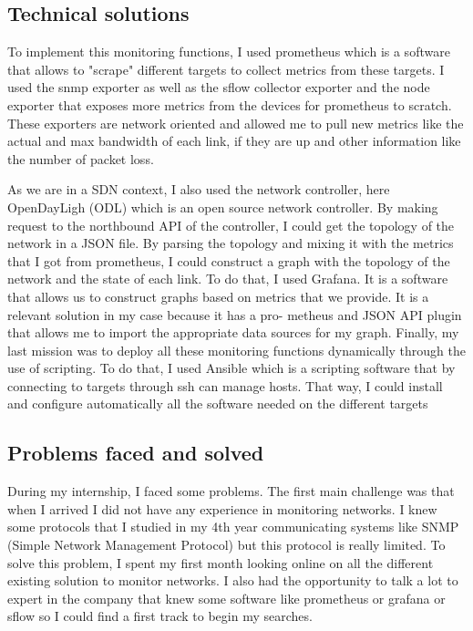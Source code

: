 \subsection{Technical solutions}

To implement this monitoring functions, I used prometheus which is a software that allows to
"scrape" different targets to collect metrics from these targets. I used the snmp exporter as well as
the sflow collector exporter and the node exporter that exposes more metrics from the devices for
prometheus to scratch. These exporters are network oriented and allowed me to pull new metrics
like the actual and max bandwidth of each link, if they are up and other information like the number
of packet loss.
\smallskip

As we are in a SDN context, I also used the network controller, here OpenDayLigh (ODL) which
is an open source network controller. By making request to the northbound API of the controller,
I could get the topology of the network in a JSON file. By parsing the topology and mixing it with
the metrics that I got from prometheus, I could construct a graph with the topology of the network
and the state of each link. To do that, I used Grafana. It is a software that allows us to construct
graphs based on metrics that we provide. It is a relevant solution in my case because it has a pro-
metheus and JSON API plugin that allows me to import the appropriate data sources for my graph.
Finally, my last mission was to deploy all these monitoring functions dynamically through the
use of scripting. To do that, I used Ansible which is a scripting software that by connecting to
targets through ssh can manage hosts. That way, I could install and configure automatically all the
software needed on the different targets


\subsection{Problems faced and solved}

During my internship, I faced some problems. The first main challenge was that when I arrived
I did not have any experience in monitoring networks. I knew some protocols that I studied in
my 4th year communicating systems like SNMP (Simple Network Management Protocol) but this
protocol is really limited. To solve this problem, I spent my first month looking online on all the
different existing solution to monitor networks. I also had the opportunity to talk a lot to expert
in the company that knew some software like prometheus or grafana or sflow so I could find a first
track to begin my searches.
\smallskip

